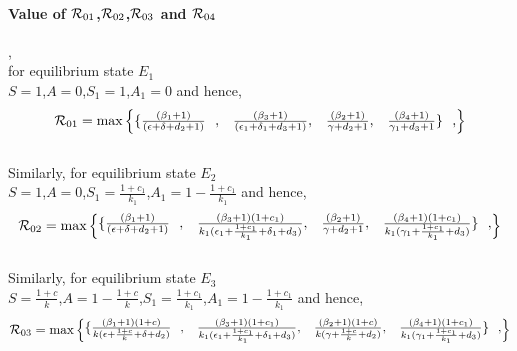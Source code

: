 \documentclass[12pt]{article}
\begin{document}
\paragraph{Value of ${{\cal R}}_{01}$,${{\cal R}}_{02}$,${{\cal R}}_{03}$ and ${{\cal R}}_{04}$},\\

for equilibrium state $E_1$\\

 $S=1$,$A=0$,$S_{1}=1$,$A_{1}=0$ and hence,\\

\begin{align}
{{\cal R}}_{01} = \text{max} \begin{Bmatrix}
\{\frac{(\beta _{1}+1)}{(\epsilon+\delta+d_{2}+1 )}\ \ ,& \frac{(\beta _{3}+1)}{ (\epsilon_{1}+\delta_{1}+d_{3}+1)}, &\frac{(\beta _{2}+1)}{\gamma+d_{2}+1},&\frac{(\beta _{4}+1)}{\gamma_{1}+d_{3}+1}\} \ \ ,
\end{Bmatrix}
\end{align}\\

Similarly, for equilibrium state $E_2$\\

$S=1$,$A=0$,$S_{1}=\frac{1+c_{1}}{k_1}$,$A_{1}=1-\frac{1+c_{1}}{k_1}$ and hence,\\

\begin{align}
{{\cal R}}_{02} = \text{max} \begin{Bmatrix}
\{\frac{(\beta _{1}+1)}{(\epsilon+\delta+d_{2}+1 )}\ \ ,
& \frac{(\beta _{3}+1)(1+c_{1})}{k_{1} (\epsilon_{1}+\frac{1+c_{1}}{k_{1}}+\delta_{1}+d_{3})}, &\frac{(\beta _{2}+1)}{\gamma+d_{2}+1},&\frac{(\beta _{4}+1)(1+c_{1})}{k_{1}(\gamma_{1}+\frac{1+c_{1}}{k_{1}}+d_{3})}\} \ \ ,
\end{Bmatrix}
\end{align}\\

Similarly, for equilibrium state $E_3$\\

$S=\frac{1+c}{k}$,$A=1-\frac{1+c}{k}$,$S_{1}=\frac{1+c_{1}}{k_1}$,$A_{1}=1-\frac{1+c_{1}}{k_1}$ and hence,\\

\begin{align}
{{\cal R}}_{03} = \text{max} \begin{Bmatrix}
\{\frac{(\beta _{1}+1)(1+c)}{k (\epsilon+\frac{1+c}{k}+\delta+d_{2})}\ \ ,& \frac{(\beta _{3}+1)(1+c_{1})}{k_{1} (\epsilon_{1}+\frac{1+c_{1}}{k_{1}}+\delta_{1}+d_{3})}, &\frac{(\beta_{2}+1)(1+c)}{k(\gamma+\frac{1+c}{k}+d_{2})},&\frac{(\beta _{4}+1)(1+c_{1})}{k_{1}(\gamma_{1}+\frac{1+c_{1}}{k_{1}}+d_{3})}\} \ \ ,
\end{Bmatrix}
\end{align}\\
\end{document}
